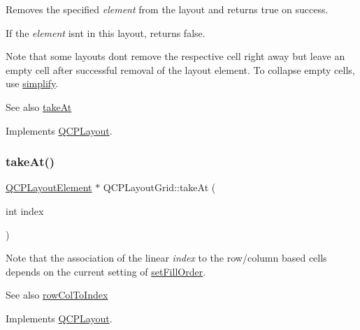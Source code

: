 Removes the specified {\itshape element} from the layout and returns true on success.

If the {\itshape element} isn\textquotesingle{}t in this layout, returns false.

Note that some layouts don\textquotesingle{}t remove the respective cell right away but leave an empty cell after successful removal of the layout element. To collapse empty cells, use \hyperlink{class_q_c_p_layout_grid_a38621ca7aa633b6a9a88617df7f08672}{simplify}.

\begin{DoxySeeAlso}{See also}
\hyperlink{class_q_c_p_layout_grid_a17dd220234d1bbf8835abcc666384d45}{take\+At} 
\end{DoxySeeAlso}


Implements \hyperlink{class_q_c_p_layout_ada26cd17e56472b0b4d7fbbc96873e4c}{Q\+C\+P\+Layout}.

\mbox{\label{class_q_c_p_layout_grid_a17dd220234d1bbf8835abcc666384d45}} 
\subsubsection{\texorpdfstring{take\+At()}{takeAt()}\hspace{0.1cm}{\footnotesize\ttfamily [1/2]}}
{\footnotesize\ttfamily \hyperlink{class_q_c_p_layout_element}{Q\+C\+P\+Layout\+Element} $\ast$ Q\+C\+P\+Layout\+Grid\+::take\+At (\begin{DoxyParamCaption}\item[{int}]{index }\end{DoxyParamCaption})\hspace{0.3cm}{\ttfamily [virtual]}}

Note that the association of the linear {\itshape index} to the row/column based cells depends on the current setting of \hyperlink{class_q_c_p_layout_grid_affc2f3cfd22f28698c5b29b960d2a391}{set\+Fill\+Order}.

\begin{DoxySeeAlso}{See also}
\hyperlink{class_q_c_p_layout_grid_a682ba76f130810ffd294032a1bfbcfcb}{row\+Col\+To\+Index} 
\end{DoxySeeAlso}


Implements \hyperlink{class_q_c_p_layout_a5a79621fa0a6eabb8b520cfc04fb601a}{Q\+C\+P\+Layout}.

